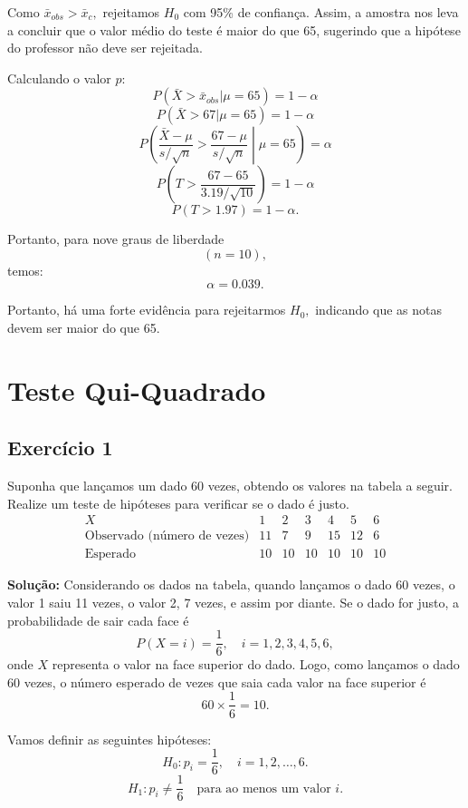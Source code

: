\documentclass{article}
\begin{document}
Como $\bar{x}_{obs} > \bar{x}_c,$ rejeitamos $H_0$ com 95\% de confiança. Assim, a amostra nos leva a concluir que o valor médio do teste é maior do que 65, sugerindo que a hipótese do professor não deve ser rejeitada.

Calculando o valor $p$:
    $$
    P(\bar{X} > \bar{x}_{obs}|\mu = 65) = 1 - \alpha
    $$
    $$
    P(\bar{X} > 67|\mu = 65) = 1 - \alpha
    $$
    $$
    P\left(\frac{\bar{X} - \mu}{s/\sqrt{n}} > \frac{67 - \mu}{s/\sqrt{n}}\middle|\mu = 65\right) = \alpha
    $$
    $$
    P\left( T > \frac{67 - 65}{3.19/\sqrt{10}}\right) = 1 - \alpha
    $$
    $$
    P(T > 1.97) = 1 - \alpha.
    $$

Portanto, para nove graus de liberdade 
    $$
    (n = 10),
    $$
temos:
    $$
    \alpha = 0.039.
    $$

Portanto, há uma forte evidência para rejeitarmos $H_0,$ indicando que as notas devem ser maior do que 65.

\section{Teste Qui-Quadrado}
\subsection{Exercício 1}
Suponha que lançamos um dado 60 vezes, obtendo os valores na tabela a seguir. Realize um teste de hipóteses para verificar se o dado é justo.
    $$
    \begin{array}{c|cccccc}
    X & 1 & 2 & 3 & 4 & 5 & 6 \\ \hline
    \text{Observado (número de vezes)} & 11 & 7 & 9 & 15 & 12 & 6 \\
    \text{Esperado} & 10 & 10 & 10 & 10 & 10 & 10
    \end{array}
    $$

\vspace{0.5cm}
\textbf{Solução:}
Considerando os dados na tabela, quando lançamos o dado 60 vezes, o valor 1 saiu 11 vezes, o valor 2, 7 vezes, e assim por diante. Se o dado for justo, a probabilidade de sair cada face é 
    $$
    P(X = i) = \frac{1}{6}, \quad i = 1, 2, 3, 4, 5, 6,
    $$
onde $X$ representa o valor na face superior do dado. Logo, como lançamos o dado 60 vezes, o número esperado de vezes que saia cada valor na face superior é 
    $$
    60 \times \frac{1}{6} = 10.
    $$

Vamos definir as seguintes hipóteses:
    $$
    H_0: p_i = \frac{1}{6}, \quad i = 1, 2, \ldots, 6.
    $$
    $$
    H_1: p_i \neq \frac{1}{6} \quad \text{para ao menos um valor } i.
    $$
\end{document}
